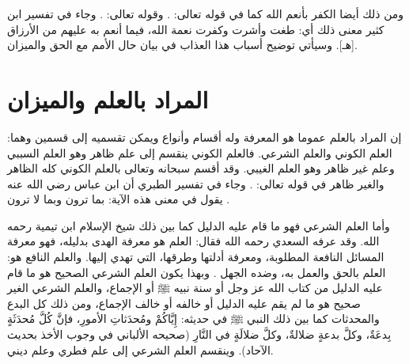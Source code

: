 ومن ذلك أيضا الكفر بأنعم الله كما في قوله تعالى:
\quranayah*[16][112]{\footnotesize \surahname*[16]}. وقوله تعالى:
\quranayah*[28][58]{\footnotesize \surahname*[28]}. وجاء في تفسير ابن كثير معنى ذلك أي: طغت وأشرت وكفرت نعمة الله، فيما أنعم به عليهم من الأرزاق [هـ]. وسيأتي توضيح أسباب هذا العذاب في بيان حال الأمم مع الحق والميزان.

\section{المراد بالعلم والميزان}

إن المراد بالعلم عموما هو المعرفة وله أقسام وأنواع ويمكن تقسميه إلى قسمين وهما: العلم الكوني والعلم الشرعي. فالعلم الكوني ينقسم إلى علم ظاهر وهو العلم السببي وعلم غير ظاهر وهو العلم الغيبي. وقد أقسم سبحانه وتعالى بالعلم الكوني كله الظاهر والغير ظاهر في قوله تعالى: \quranayah*[69][38-38]{\footnotesize \surahname*[69]}. وجاء في تفسير الطبري أن ابن عباس رضي الله عنه يقول في معنى هذه الآية: بما ترون وبما لا ترون \href{https://shamela.ws/book/7798/15576#p1}{\faExternalLink} \cite{tafsir_Tabari}.

وأما العلم الشرعي فهو ما قام عليه الدليل كما بين ذلك شيخ الإسلام ابن تيمية رحمه الله. وقد عرفه السعدي رحمه الله فقال: العلم هو معرفة الهدى بدليله، فهو معرفة المسائل النافعة المطلوبة، ومعرفة أدلتها وطرقها، التي تهدي إليها. والعلم النافع هو: العلم بالحق والعمل به، وضده الجهل \href{https://shamela.ws/book/42/2144#p20}{\faExternalLink} \cite{tafsir_Saadi}. وبهذا يكون العلم الشرعي الصحيح هو ما قام عليه الدليل من كتاب الله عز وجل أو سنة نبيه ﷺ أو الإجماع، والعلم الشرعي الغير صحيح هو ما لم يقم عليه الدليل أو خالفه أو خالف الإجماع، ومن ذلك كل البدع والمحدثات كما بين ذلك النبي ﷺ في حديثه: إِيَّاكُمْ ومُحدَثاتِ الأمورِ، فإنَّ كُلَّ مُحدَثَةٍ بِدعَةٌ، وكلَّ بدعةٍ ضلالةٌ، وكلَّ ضلالَةٍ في النَّارِ {\footnotesize (صحيحه الألباني في وجوب الأخذ بحديث الآحاد)}. وينقسم العلم الشرعي إلى علم فطري وعلم ديني. 

